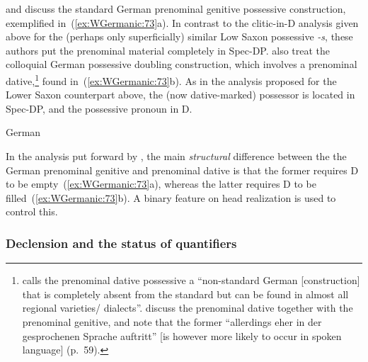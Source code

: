 \documentclass[output=paper,hidelinks]{langscibook}
\begin{document}
\hspace*{-2.5pt}\citet{berman-frank:1996} and \citet{dipper03} discuss the standard
German prenominal genitive possessive construction, exemplified
in~(\ref{ex:WGermanic:73}a). In contrast to the clitic-in-D analysis given above for
the (perhaps only superficially) similar Low Saxon possessive
\textit{-s}, these authors put the prenominal material completely in
Spec-DP.  \citet{berman-frank:1996} also treat the colloquial German
possessive doubling construction, which involves a prenominal
dative,\footnote{\citet[58--59]{kasper:2014} calls the prenominal dative possessive a
``non-standard German [construction] that is completely absent from
the standard but can be found in almost all regional
varieties/ dialects''. \citet{berman-frank:1996} discuss the
prenominal dative together with the prenominal genitive, and note that
the former ``allerdings eher in der gesprochenen Sprache auftritt''
[is however more likely to occur in spoken language] (p.~59).} found
in~(\ref{ex:WGermanic:73}b). As in the analysis proposed for the Lower Saxon
counterpart above, the (now dative-marked) possessor is located in
Spec-DP, and the possessive pronoun in D.
%
\begin{exe}
  \ex\label{ex:WGermanic:73} German \citep[§3.1.2, example 136, 141]{berman-frank:1996}
  \begin{xlist}
  \end{xlist}
  \end{exe}
%
In the analysis put forward by \citeauthor{berman-frank:1996}, the
main \textit{structural} difference between the the German prenominal genitive
and prenominal dative is that the former requires D to be
empty~(\ref{ex:WGermanic:73}a), whereas the latter requires D to be
filled~(\ref{ex:WGermanic:73}b). A binary feature on head realization is used to
control this.

\subsubsection{Declension and the status of quantifiers\label{sec:Germanic:dquant_aquant}}
\end{document}
